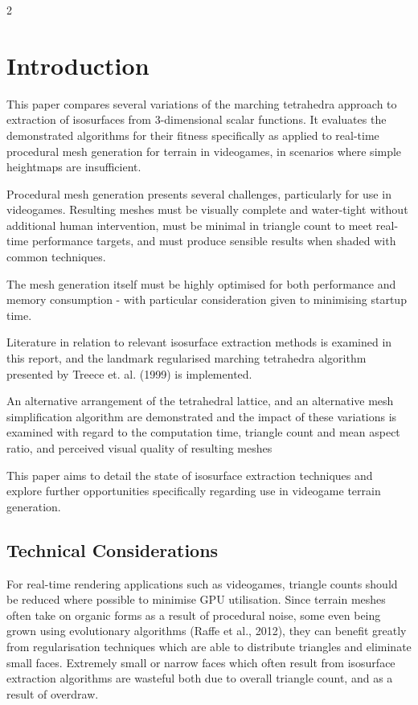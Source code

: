 \documentclass[]{article}
\begin{document}
\begin{multicols}{2}

\section{Introduction}\label{introduction}

This paper compares several variations of the marching tetrahedra approach to extraction of isosurfaces from 3-dimensional scalar functions. It evaluates the demonstrated algorithms for their fitness specifically as applied to real-time procedural mesh generation for terrain in videogames, in scenarios where simple heightmaps are insufficient.

Procedural mesh generation presents several challenges, particularly for use in videogames. Resulting meshes must be visually complete and water-tight without additional human intervention, must be minimal in triangle count to meet real-time performance targets, and must produce sensible results when shaded with common techniques.

The mesh generation itself must be highly optimised for both performance and memory consumption - with particular consideration given to minimising startup time.

Literature in relation to relevant isosurface extraction methods is examined in this report, and the landmark \textquotesingle regularised marching tetrahedra\textquotesingle{} algorithm presented by Treece et. al. (1999) is implemented.

An alternative arrangement of the tetrahedral lattice, and an alternative mesh simplification algorithm are demonstrated and the impact of these variations is examined with regard to the computation time, triangle count and mean aspect ratio, and perceived visual quality of resulting meshes

This paper aims to detail the state of isosurface extraction techniques and explore further opportunities specifically regarding use in videogame terrain generation.

\subsection{Technical Considerations}\label{technical-considerations}

For real-time rendering applications such as videogames, triangle counts should be reduced where possible to minimise GPU utilisation. Since terrain meshes often take on organic forms as a result of procedural noise, some even being grown using evolutionary algorithms (Raffe et al., 2012), they can benefit greatly from regularisation techniques which are able to distribute triangles and eliminate small faces. Extremely small or narrow faces which often result from isosurface extraction algorithms are wasteful both due to overall triangle count, and as a result of overdraw.


\end{multicols}
\end{document}
